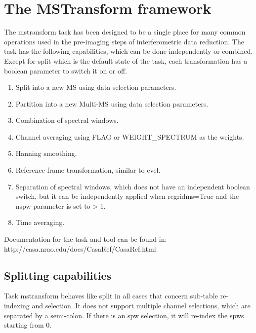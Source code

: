 

\section{The MSTransform framework}\label{Sec:Running}
The mstransform task has been designed to be a single place for many
common operations used in the pre-imaging steps of interferometric
data reduction. The task has the following capabilities, which can be done
independently or combined. Except for split which is the default state of 
the task, each transformation has a boolean parameter to switch it on
or off.

\begin{enumerate}
\item Split into a new MS using data selection parameters.
\item Partition into a new Multi-MS using data selection parameters.
\item Combination of spectral windows.
\item Channel averaging using FLAG or WEIGHT_SPECTRUM as the weights.
\item Hanning smoothing.
\item Reference frame transformation, similar to cvel.
\item Separation of spectral windows, which does not have an independent
boolean switch, but it can be independently applied when regridms=True and
the nspw parameter is set to > 1.
\item Time averaging.

\end{enumerate}


Documentation for the task and tool can be found in:
 {http://casa.nrao.edu/docs/CasaRef/CasaRef.html}

\subsection{Splitting capabilities}
Task mstransform behaves like split in all cases that concern sub-table re-indexing
and selection. It does not support multiple channel selections, which are separated by
a semi-colon. If there is an spw selection, it will re-index the spws starting from 0.

